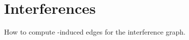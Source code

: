 \documentclass[12pt]{article}
\begin{document}
\section{\AMi Interferences}

How to compute \AMi-induced edges for the interference graph.


%
%

\begin{algorithm}
\end{algorithm}
\end{document}
